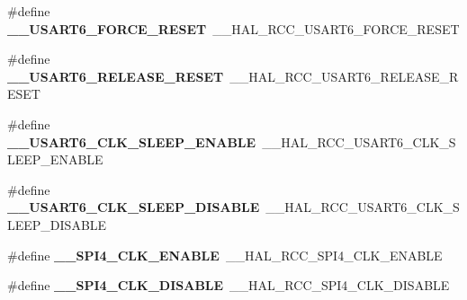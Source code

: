 \begin{DoxyCompactItemize}
\mbox{\label{group___h_a_l___r_c_c___aliased_ga1a9db7963c878ef6018ff9bbc439e8ca}} 
\#define {\bfseries \+\_\+\+\_\+\+U\+S\+A\+R\+T6\+\_\+\+F\+O\+R\+C\+E\+\_\+\+R\+E\+S\+ET}~\+\_\+\+\_\+\+H\+A\+L\+\_\+\+R\+C\+C\+\_\+\+U\+S\+A\+R\+T6\+\_\+\+F\+O\+R\+C\+E\+\_\+\+R\+E\+S\+ET
\item 
\mbox{\label{group___h_a_l___r_c_c___aliased_ga78937fd5dc3a98a2aea8b54a276ab49a}} 
\#define {\bfseries \+\_\+\+\_\+\+U\+S\+A\+R\+T6\+\_\+\+R\+E\+L\+E\+A\+S\+E\+\_\+\+R\+E\+S\+ET}~\+\_\+\+\_\+\+H\+A\+L\+\_\+\+R\+C\+C\+\_\+\+U\+S\+A\+R\+T6\+\_\+\+R\+E\+L\+E\+A\+S\+E\+\_\+\+R\+E\+S\+ET
\item 
\mbox{\label{group___h_a_l___r_c_c___aliased_gaabd2ca8c095af0b15f7da6145c4bf5ee}} 
\#define {\bfseries \+\_\+\+\_\+\+U\+S\+A\+R\+T6\+\_\+\+C\+L\+K\+\_\+\+S\+L\+E\+E\+P\+\_\+\+E\+N\+A\+B\+LE}~\+\_\+\+\_\+\+H\+A\+L\+\_\+\+R\+C\+C\+\_\+\+U\+S\+A\+R\+T6\+\_\+\+C\+L\+K\+\_\+\+S\+L\+E\+E\+P\+\_\+\+E\+N\+A\+B\+LE
\item 
\mbox{\label{group___h_a_l___r_c_c___aliased_gafaf27c45d3b3da58e5144c54a6765166}} 
\#define {\bfseries \+\_\+\+\_\+\+U\+S\+A\+R\+T6\+\_\+\+C\+L\+K\+\_\+\+S\+L\+E\+E\+P\+\_\+\+D\+I\+S\+A\+B\+LE}~\+\_\+\+\_\+\+H\+A\+L\+\_\+\+R\+C\+C\+\_\+\+U\+S\+A\+R\+T6\+\_\+\+C\+L\+K\+\_\+\+S\+L\+E\+E\+P\+\_\+\+D\+I\+S\+A\+B\+LE
\item 
\mbox{\label{group___h_a_l___r_c_c___aliased_ga910bbf1355bfeb7eaa6ee38c71073f74}} 
\#define {\bfseries \+\_\+\+\_\+\+S\+P\+I4\+\_\+\+C\+L\+K\+\_\+\+E\+N\+A\+B\+LE}~\+\_\+\+\_\+\+H\+A\+L\+\_\+\+R\+C\+C\+\_\+\+S\+P\+I4\+\_\+\+C\+L\+K\+\_\+\+E\+N\+A\+B\+LE
\item 
\mbox{\label{group___h_a_l___r_c_c___aliased_ga8903b53e01525864794aed36ce5283b2}} 
\#define {\bfseries \+\_\+\+\_\+\+S\+P\+I4\+\_\+\+C\+L\+K\+\_\+\+D\+I\+S\+A\+B\+LE}~\+\_\+\+\_\+\+H\+A\+L\+\_\+\+R\+C\+C\+\_\+\+S\+P\+I4\+\_\+\+C\+L\+K\+\_\+\+D\+I\+S\+A\+B\+LE
\item 
\mbox{\label{group___h_a_l___r_c_c___aliased_gab55fe3173b3e14b97dd5c87cd99162b2}} 

\end{DoxyCompactItemize}
